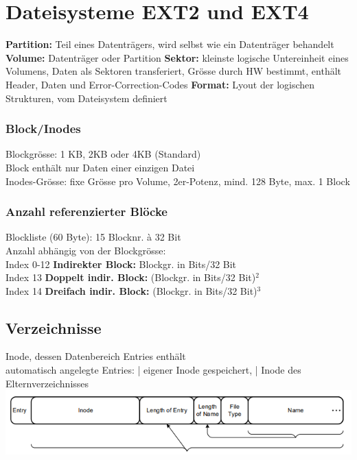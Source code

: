 \section{Dateisysteme EXT2 und EXT4}
\textbf{Partition: }Teil eines Datenträgers, wird selbst wie ein Datenträger behandelt
\textbf{Volume: }Datenträger oder Partition
\textbf{Sektor: }kleinste logische Untereinheit eines Volumens, Daten als Sektoren transferiert, Grösse durch HW bestimmt, enthält Header, Daten und Error-Correction-Codes
\textbf{Format: }Lyout der logischen Strukturen, vom Dateisystem definiert

\subsubsection{Block/Inodes}
Blockgrösse: 1 KB, 2KB oder 4KB (Standard)\\
Block enthält nur Daten einer einzigen Datei\\
Inodes-Grösse: fixe Grösse pro Volume, 2er-Potenz, mind. 128 Byte, max. 1 Block

\subsubsection{Anzahl referenzierter Blöcke}
Blockliste (60 Byte): 15 Blocknr. à 32 Bit\\
Anzahl abhängig von der Blockgrösse:\\
Index 0-12 \textbf{Indirekter Block:} Blockgr. in Bits/32 Bit\\
Index 13 \textbf{Doppelt indir. Block:} (Blockgr. in Bits/32 Bit)$^{2}$\\
Index 14 \textbf{Dreifach indir. Block:} (Blockgr. in Bits/32 Bit)$^3$


\subsection{Verzeichnisse}
Inode, dessen Datenbereich Entries enthält\\
automatisch angelegte Entries:
 | eigener Inode gespeichert,  | Inode des Elternverzeichnisses\\
\includegraphics[scale = 0.4]{grafiken/entry.PNG}

